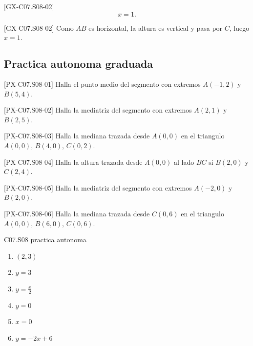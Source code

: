 \begin{shortanswer}{[GX-C07.S08-02]}
\[
x=1.
\]
\end{shortanswer}

\begin{fullsolution}{[GX-C07.S08-02]}
Como \(AB\) es horizontal, la altura es vertical y pasa por \(C\), luego \(x=1\).
\end{fullsolution}

\subsection*{Practica autonoma graduada}
\begin{exercise}{[PX-C07.S08-01] Halla el punto medio del segmento con extremos \(A(-1,2)\) y \(B(5,4)\).}
\end{exercise}
\begin{exercise}{[PX-C07.S08-02] Halla la mediatriz del segmento con extremos \(A(2,1)\) y \(B(2,5)\).}
\end{exercise}
\begin{exercise}{[PX-C07.S08-03] Halla la mediana trazada desde \(A(0,0)\) en el triangulo \(A(0,0)\), \(B(4,0)\), \(C(0,2)\).}
\end{exercise}
\begin{exercise}{[PX-C07.S08-04] Halla la altura trazada desde \(A(0,0)\) al lado \(BC\) si \(B(2,0)\) y \(C(2,4)\).}
\end{exercise}
\begin{exercise}{[PX-C07.S08-05] Halla la mediatriz del segmento con extremos \(A(-2,0)\) y \(B(2,0)\).}
\end{exercise}
\begin{exercise}{[PX-C07.S08-06] Halla la mediana trazada desde \(C(0,6)\) en el triangulo \(A(0,0)\), \(B(6,0)\), \(C(0,6)\).}
\end{exercise}

\begin{shortanswer}{C07.S08 practica autonoma}
\begin{enumerate}[label=\textbf{PX-C07.S08-\arabic*:}, leftmargin=*]
  \item \((2,3)\)
  \item \(y=3\)
  \item \(y=\frac{x}{2}\)
  \item \(y=0\)
  \item \(x=0\)
  \item \(y=-2x+6\)
\end{enumerate}
\end{shortanswer}

